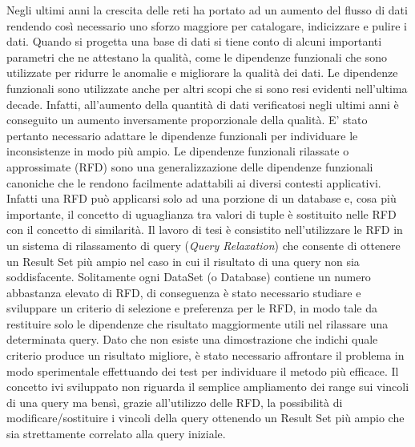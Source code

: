 Negli ultimi anni la crescita delle reti ha portato ad un aumento del flusso di dati rendendo così necessario uno sforzo maggiore per catalogare, indicizzare e pulire i dati. 
Quando si progetta una base di dati si tiene conto di alcuni importanti parametri che ne attestano la qualità, come le dipendenze funzionali che sono utilizzate per ridurre le anomalie e migliorare la qualità dei dati.
Le dipendenze funzionali sono utilizzate anche per altri scopi che si sono resi evidenti nell’ultima decade. Infatti,  all’aumento della quantità di dati verificatosi negli ultimi anni è conseguito un aumento inversamente proporzionale della qualità. E' stato pertanto necessario adattare le dipendenze funzionali per individuare le inconsistenze in modo più ampio.
Le dipendenze funzionali rilassate o approssimate (RFD) sono una generalizzazione delle dipendenze funzionali canoniche che le rendono facilmente adattabili ai diversi contesti applicativi. Infatti una RFD può applicarsi solo ad una porzione di un database e, cosa più importante, il concetto di uguaglianza tra valori di tuple è sostituito nelle RFD  con il concetto di similarità. 
Il lavoro di tesi è consistito nell’utilizzare le RFD in un sistema di rilassamento di query (\emph{Query Relaxation}) che consente di ottenere un Result Set più ampio nel caso in cui il risultato di una query non sia soddisfacente. Solitamente ogni DataSet (o Database) contiene un numero abbastanza elevato di RFD, di conseguenza è stato necessario studiare e sviluppare un criterio di selezione e preferenza per le RFD, in modo tale da restituire solo le dipendenze che risultato maggiormente utili nel rilassare una determinata query. Dato che non esiste una dimostrazione che indichi quale criterio produce un risultato migliore, è stato necessario affrontare il problema in modo sperimentale effettuando dei test per individuare il metodo più efficace.
Il concetto ivi sviluppato non riguarda il semplice ampliamento dei range sui vincoli di una query ma bensì, grazie all'utilizzo delle RFD, la possibilità di modificare/sostituire i vincoli della query ottenendo un Result Set più ampio che sia strettamente correlato alla query iniziale.